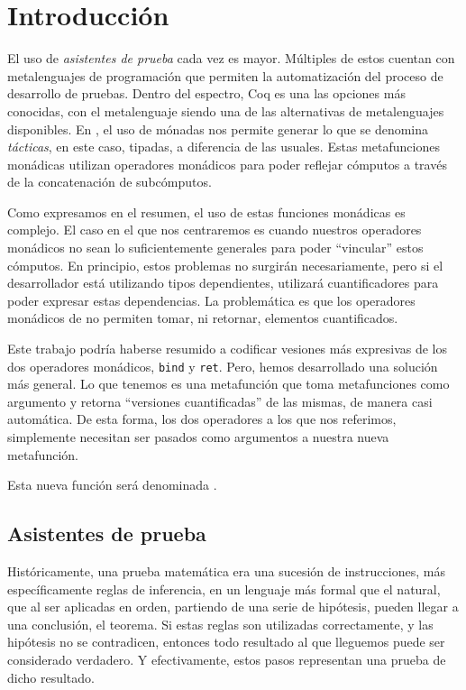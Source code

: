 \chapter{Introducción}\label{ch:intro}

El uso de \emph{asistentes de prueba} cada vez es mayor.
Múltiples de estos cuentan con metalenguajes de programación que permiten la automatización del proceso de desarrollo de pruebas.
Dentro del espectro, Coq \cite{CIC} es una las opciones más conocidas, con el metalenguaje \mtac \cite{DBLP:journals/pacmpl/KaiserZKRD18} siendo una de las alternativas de metalenguajes disponibles.
En \Mtac, el uso de mónadas nos permite generar lo que se denomina \emph{tácticas}, en este caso, tipadas, a diferencia de las usuales.
Estas metafunciones monádicas utilizan operadores monádicos para poder reflejar cómputos a través de la concatenación de subcómputos.

Como expresamos en el resumen, el uso de estas funciones monádicas es complejo.
El caso en el que nos centraremos es cuando nuestros operadores monádicos no sean lo suficientemente generales para poder ``vincular'' estos cómputos.
En principio, estos problemas no surgirán necesariamente, pero si el desarrollador está utilizando tipos dependientes, utilizará cuantificadores para poder expresar estas dependencias. La problemática es que los operadores monádicos de \mtac no permiten tomar, ni retornar, elementos cuantificados.

Este trabajo podría haberse resumido a codificar vesiones más expresivas de los dos operadores monádicos, \lstinline{bind} y \lstinline{ret}.
Pero, hemos desarrollado una solución más general.
Lo que tenemos es una metafunción que toma metafunciones como argumento y retorna ``versiones cuantificadas'' de las mismas, de manera casi automática.
De esta forma, los dos operadores a los que nos referimos, simplemente necesitan ser pasados como argumentos a nuestra nueva metafunción.

Esta nueva función será denominada \lift.

\section{Asistentes de prueba}

Históricamente, una prueba matemática era una sucesión de instrucciones, más específicamente reglas de inferencia, en un lenguaje más formal que el natural, que al ser aplicadas en orden, partiendo de una serie de hipótesis, pueden llegar a una conclusión, el teorema.
Si estas reglas son utilizadas correctamente, y las hipótesis no se contradicen, entonces todo resultado al que lleguemos puede ser considerado verdadero. Y efectivamente, estos pasos representan una prueba de dicho resultado.

